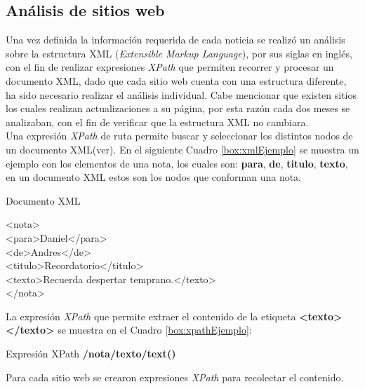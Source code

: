 \subsection{Análisis de sitios web}

Una vez definida la información requerida de cada noticia se realizó un análisis sobre la estructura XML (\textit{Extensible Markup Language}), por sus siglas en inglés, con el fin de realizar expresiones \textit{XPath} que permiten recorrer y procesar un documento XML, dado que cada sitio web cuenta con una estructura diferente, ha sido necesario realizar el análisis individual. Cabe mencionar que existen sitios los cuales realizan actualizaciones a su página, por esta razón cada dos meses se analizaban, con el fin de verificar que la estructura XML no cambiara.\\

Una expresión \textit{XPath} de ruta permite buscar y seleccionar los distintos nodos de un documento XML(ver). En el siguiente Cuadro \ref{box:xmlEjemplo} se muestra un ejemplo con los elementos de una nota, los cuales son: \textbf{para}, \textbf{de}, \textbf{titulo}, \textbf{texto}, en un documento XML estos son los nodos que conforman una nota.\\

\begin{mygraybox}[label={box:xmlEjemplo}]{Documento XML}
\begin{tabbing}
<nota> \= \\\kill
\>	<para>Daniel</para>\\
\>	<de>Andres</de>\\
\>	<titulo>Recordatorio</titulo>\\
\>	<texto>Recuerda despertar temprano.</texto>\\
</nota>
\end{tabbing}
\end{mygraybox}

La expresión \textit{XPath} que permite extraer el contenido de la etiqueta \textbf{<texto> </texto>} se muestra en el Cuadro \ref{box:xpathEjemplo}: \\

\begin{mygraybox}[label={box:xpathEjemplo}]{Expresión XPath} 
\textbf{/nota/texto/text()}
\end{mygraybox}

Para cada sitio web se crearon expresiones \textit{XPath} para recolectar el contenido.

